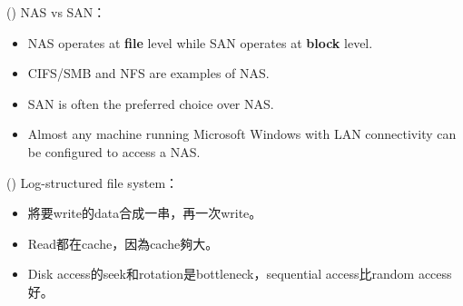 \item \begin{theorem}{()} NAS vs SAN： \begin{itemize}
        \item NAS operates at \textbf{file} level while SAN operates at \textbf{block} level.
        \item CIFS/SMB and NFS are examples of NAS.
        \item SAN is often the preferred choice over NAS.
        \item Almost any machine running Microsoft Windows with LAN connectivity can be configured to access a NAS.
    \end{itemize}
\end{theorem}

\item \begin{theorem}{()} Log-structured file system： \begin{itemize}
        \item 將要write的data合成一串，再一次write。
        \item Read都在cache，因為cache夠大。
        \item Disk access的seek和rotation是bottleneck，sequential access比random access好。
    \end{itemize}
\end{theorem}

